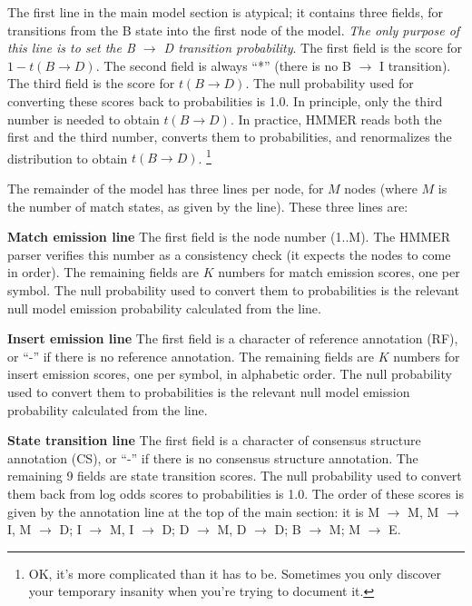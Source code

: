 The first line in the main model section is atypical; it contains
three fields, for transitions from the B state into the first node of
the model. \textit{The only purpose of this line is to set the B
$\rightarrow$ D transition probability}. The first field is the score
for $ 1 - t(B \rightarrow D)$. The second field is always ``*'' (there is no B
$\rightarrow$ I transition). The third field is the score for
$t(B\rightarrow D)$. The null probability used for converting these
scores back to probabilities is 1.0. In principle, only the third
number is needed to obtain $t(B \rightarrow D)$.  In practice, HMMER
reads both the first and the third number, converts them to
probabilities, and renormalizes the distribution to obtain $t(B
\rightarrow D)$. \footnote{OK, it's more complicated than it has to
be. Sometimes you only discover your temporary insanity when you're
trying to document it.}

The remainder of the model has three lines per node, for $M$ nodes
(where $M$ is the number of match states, as given by the 
line). These three lines are:

\begin{wideitem}

\item [\textbf{Match emission line}] The first field is the node number (1..M).
The HMMER parser verifies this number as a consistency check (it
expects the nodes to come in order). The remaining fields are $K$
numbers for match emission scores, one per symbol. The null
probability used to convert them to probabilities is the relevant null
model emission probability calculated from the  line.

\item [\textbf{Insert emission line}] The first field is a character of
reference annotation (RF), or ``-'' if there is no reference
annotation. The remaining fields are $K$ numbers for insert emission
scores, one per symbol, in alphabetic order. The null probability used
to convert them to probabilities is the relevant null model emission
probability calculated from the  line.

\item [\textbf{State transition line}] The first field is a character
of consensus structure annotation (CS), or ``-'' if there is no
consensus structure annotation. The remaining 9 fields are state
transition scores. The null probability used to convert them back from
log odds scores to probabilities is 1.0. The order of these scores is
given by the annotation line at the top of the main section: it is M
$\rightarrow$ M, M $\rightarrow$ I, M $\rightarrow$ D; I $\rightarrow$
M, I $\rightarrow$ D; D $\rightarrow$ M, D $\rightarrow$ D; B
$\rightarrow$ M; M $\rightarrow$ E.

\end{wideitem}

